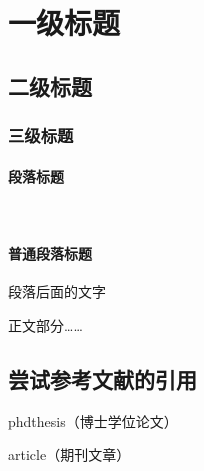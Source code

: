 \documentclass[oneside]{cdut_thesis} %
\begin{document}

\setcounter{page}{1}   %


{\thispagestyle{fancy}}  %
\null \tableofcontents         %
{\thispagestyle{fancy}}  %


\newpage
\setcounter{page}{1}    %

\null\par
\section{一级标题}
\subsection{二级标题}
\subsubsection{三级标题}
\paragraph{段落标题}~{}\par
\paragraph{普通段落标题}段落后面的文字


正文部分……


\subsection{尝试参考文献的引用}
phdthesis（博士学位论文）\cite{phdthesis_example}

article（期刊文章）\cite{article_example}
\end{document}
